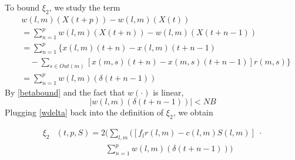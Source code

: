 \begin{IEEEproof}
%
To bound $\xi_2$, we study the term
\begin{align} \nonumber
&w(l,m)(X(t+p))   -  w(l,m)(X(t)) \\ \nonumber
& = \sum_{n=1}^{p} w(l,m)(X(t+n)) - w(l,m)(X(t + n - 1)) \\ \nonumber
&= \sum_{n=1}^{p} \Big\{ x(l,m)(t + n) - x(l,m)(t + n - 1)   \\ \nonumber 
&  \quad - \sum_{s \in Out(m)}[ x(m,s)(t + n) - x(m,s)(t + n - 1) ]r(m,s)  \Big\} \\ 
&= \sum_{n=1}^{p}  w(l,m)( \delta(t + n - 1)) 
\end{align}
By \eqref{betabound} and the fact that $w(\cdot)$ is linear,  
\begin{equation} \label{wdelta}
\vert w(l,m)(\delta(t + n -1)) \vert <NB
\end{equation}
Plugging \eqref{wdelta} back into the definition of $\xi_2$, we obtain
\begin{small}
\begin{align} \nonumber 
\xi_2&(t,p,S) = 2\bigg( \sum_{l,m}\big([f_{l}r(l,m) - c(l,m)S(l,m)] \; \cdot \\  \nonumber
&\qquad \qquad \qquad  \sum_{n=1}^{p}  w(l,m)( \delta(t + n - 1))\bigg)  \\ \nonumber

\end{align}
\end{small}
\end{IEEEproof}
